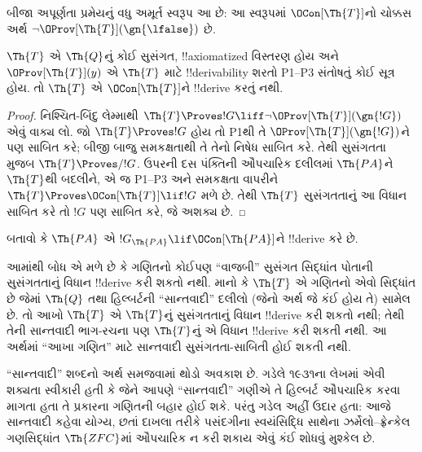 \documentclass[../../../include/open-logic-section]{subfiles}
\begin{document}
બીજા અપૂર્ણતા પ્રમેયનું વધુ અમૂર્ત સ્વરૂપ આ છે:
આ સ્વરૂપમાં $\OCon[\Th{T}]$નો ચોક્કસ અર્થ
$\lnot\OProv[\Th{T}](\gn{\lfalse})$ છે.

\begin{thm}
$\Th{T}$ એ $\Th{Q}$નું કોઈ સુસંગત, !!{axiomatized} વિસ્તરણ હોય અને $\OProv[\Th{T}](y)$ એ $\Th{T}$ માટે !!{derivability} શરતો P1--P3 સંતોષતું કોઈ સૂત્ર હોય. તો $\Th{T}$ એ $\OCon[\Th{T}]$ને !!{derive} કરતું નથી.
\end{thm}
\begin{proof}
નિશ્ચિત-બિંદુ લેમ્માથી $\Th{T}\Proves
!G\liff\lnot\OProv[\Th{T}](\gn{!G})$ એવું વાક્ય
લો. જો $\Th{T}\Proves !G$ હોય તો P1થી તે
$\OProv[\Th{T}](\gn{!G})$ને પણ સાબિત કરે; બીજી
બાજુ સમકક્ષતાથી તે તેનો નિષેધ સાબિત કરે. તેથી
સુસંગતતા મુજબ $\Th{T}\Proves/ !G$.
ઉપરની દસ પંક્તિની ઔપચારિક દલીલમાં $\Th{PA}$ને
$\Th{T}$થી બદલીને, એ જ P1--P3 અને સમકક્ષતા
વાપરીને $\Th{T}\Proves\OCon[\Th{T}]\lif !G$
મળે છે. તેથી $\Th{T}$ સુસંગતતાનું આ વિધાન સાબિત
કરે તો $!G$ પણ સાબિત કરે, જે અશક્ય છે.
\end{proof}

\begin{prob}
બતાવો કે $\Th{PA}$ એ $!G_{\Th{PA}} \lif \OCon[\Th{PA}]$ને !!{derive} કરે છે.
\end{prob}

\begin{digress}
આમાંથી બોધ એ મળે છે કે ગણિતનો કોઈપણ ``વાજબી'' સુસંગત સિદ્ધાંત પોતાની સુસંગતતાનું વિધાન !!{derive} કરી શકતો નથી. માનો કે $\Th{T}$ એ ગણિતનો એવો સિદ્ધાંત છે જેમાં $\Th{Q}$ તથા હિલ્બર્ટની ``સાન્તવાદી'' દલીલો (જેનો અર્થ જે કંઈ હોય તે) સામેલ છે. તો આખો $\Th{T}$ એ $\Th{T}$નું સુસંગતતાનું વિધાન !!{derive} કરી શકતો નથી; તેથી તેની સાન્તવાદી ભાગ-રચના પણ $\Th{T}$નું એ વિધાન !!{derive} કરી શકતી નથી. આ અર્થમાં ``આખા ગણિત'' માટે સાન્તવાદી સુસંગતતા-સાબિતી હોઈ શકતી નથી.

``સાન્તવાદી'' શબ્દનો અર્થ સમજવામાં થોડો અવકાશ છે. ગડેલે ૧૯૩૧ના લેખમાં એવી શક્યતા સ્વીકારી હતી કે જેને આપણે ``સાન્તવાદી'' ગણીએ તે હિલ્બર્ટ ઔપચારિક કરવા માગતા હતા તે પ્રકારના ગણિતની બહાર હોઈ શકે. પરંતુ ગડેલ અહીં ઉદાર હતા: આજે સાન્તવાદી કહેવા યોગ્ય, છતાં દાખલા તરીકે પસંદગીના સ્વયંસિદ્ધિ સાથેના ઝર્મેલો--ફ્રેન્કેલ ગણસિદ્ધાંત $\Th{ZFC}$માં ઔપચારિક ન કરી શકાય એવું કંઈ શોધવું મુશ્કેલ છે.
\end{digress}
\end{document}
